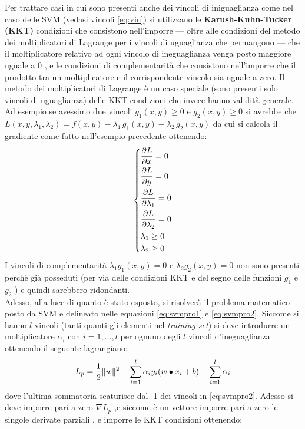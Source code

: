 Per trattare casi in cui sono presenti anche dei vincoli di iniguaglianza come nel caso delle \ac{SVM} (vedasi vincoli \eqref{eq:vin}) si utilizzano le \textbf{Karush-Kuhn-Tucker (KKT)} condizioni che consistono nell'imporre --- oltre alle condizioni del metodo dei moltiplicatori di Lagrange per i vincoli di uguaglianza che permangono --- che il moltiplicatore relativo ad ogni vincolo di ineguaglianza venga posto maggiore uguale a 0 , e le condizioni di complementarità che consistono nell'imporre che il prodotto tra un moltiplicatore e il corrispondente vincolo sia uguale a zero. Il metodo dei moltiplicatori di Lagrange  è un caso speciale (sono presenti solo vincoli di uguaglianza) delle KKT condizioni che invece hanno validità generale.
Ad esempio se avessimo due vincoli $g_{1}(x,y) \geq 0 \text{ e } g_{2}(x,y) \geq 0$ si avrebbe che $L(x,y,\lambda_{1},\lambda_{2}) = f(x,y) - \lambda_{1}\,g_{1}(x,y) - \lambda_{2}\,g_{2}(x,y)$ da cui si calcola il gradiente come fatto nell'esempio precedente ottenendo:
\[
\begin{dcases}
\frac{\partial L}{\partial x} = 0 \\
\frac{\partial L}{\partial y} = 0 \\
\frac{\partial L}{\partial \lambda_{1}} = 0 \\
\frac{\partial L}{\partial \lambda_{2}} = 0 \\
\lambda_{1} \geq 0 \\
\lambda_{2} \geq 0
\end{dcases}
\]
I vincoli di complementarità $\lambda_{1}g_{1}(x,y) = 0$ e $\lambda_{2}g_{2}(x,y) = 0$ non sono presenti perchè già posseduti (per via delle condizioni KKT e del segno delle funzioni $g_{1}$ e $g_{2}$ ) e quindi sarebbero ridondanti.\\
Adesso, alla luce di quanto è stato esposto, si risolverà il problema matematico posto da \ac{SVM} e delineato nelle equazioni \eqref{eq:svmpro1} e \eqref{eq:svmpro2}. Siccome si hanno $l$ vincoli (tanti quanti gli elementi nel \textit{training set}) si deve introdurre un moltiplicatore $\alpha_{i} \text{ con } i=1,\dots,l$ per ognuno degli $l$ vincoli d'ineguaglianza ottenendo il seguente lagrangiano:
\begin{equation}
\label{eq:pri}
L_{p} = \frac{1}{2}\lVert w\rVert^{2} - \sum_{i=1}^{l}\alpha_{i}y_{i}(w \bullet x_{i} + b) + \sum_{i=1}^{l}\alpha_{i}
\end{equation}
dove l'ultima sommatoria scaturisce dal -1 dei vincoli in \eqref{eq:svmpro2}.
Adesso si deve imporre pari a zero $\nabla L_{p}$ ,e siccome è un vettore imporre pari a zero le singole derivate parziali , e imporre le KKT condizioni ottenendo:

